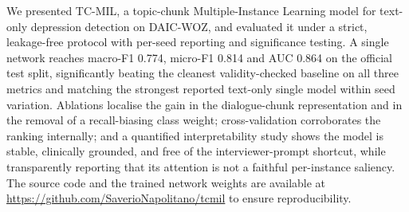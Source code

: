 \documentclass[conference]{IEEEtran}
\begin{document}
We presented TC-MIL, a topic-chunk Multiple-Instance Learning model for
text-only depression detection on DAIC-WOZ, and evaluated it under a strict,
leakage-free protocol with per-seed reporting and significance testing. A
single network reaches macro-F1 0.774, micro-F1 0.814 and AUC 0.864 on the
official test split, significantly beating the cleanest validity-checked
baseline on all three metrics and matching the strongest reported text-only
single model within seed variation. Ablations
localise the gain in the dialogue-chunk representation and in the removal of a
recall-biasing class weight; cross-validation corroborates the ranking
internally; and a quantified interpretability study shows the model is stable,
clinically grounded, and free of the interviewer-prompt shortcut, while
transparently reporting that its attention is not a faithful per-instance saliency. The source
code and the trained network weights are available at
\url{https://github.com/SaverioNapolitano/tcmil} to ensure reproducibility.

%
\end{document}
